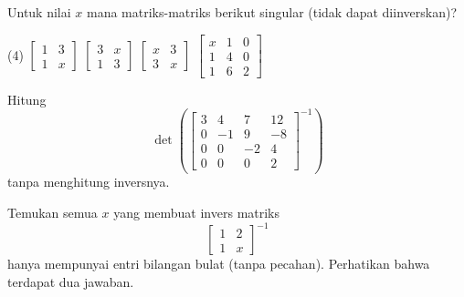\begin{exercise}
Untuk nilai $x$ mana matriks-matriks berikut singular (tidak dapat diinverskan)?
\begin{tasks}(4)
\task
$\begin{bmatrix}
1 & 3 \\
1 & x
\end{bmatrix}$
\task
$\begin{bmatrix}
3 & x \\
1 & 3
\end{bmatrix}$
\task
$\begin{bmatrix}
x & 3 \\
3 & x
\end{bmatrix}$
\task
$\begin{bmatrix}
x & 1 & 0 \\
1 & 4 & 0 \\
1 & 6 & 2
\end{bmatrix}$
\end{tasks}
\end{exercise}

\begin{exercise}
Hitung
\begin{equation*}
\det \left( \begin{bmatrix}
3 & 4 & 7 & 12 \\
0 & -1 & 9 & -8 \\
0 & 0 & -2 & 4 \\
0 & 0 & 0 & 2
\end{bmatrix}^{-1}
\right)
\end{equation*}
tanpa menghitung inversnya.
\end{exercise}

\begin{exercise}[menantang]
Temukan semua $x$ yang membuat invers matriks
\begin{equation*}
\begin{bmatrix}
1 & 2 \\ 1 & x
\end{bmatrix}^{-1}
\end{equation*}
hanya mempunyai entri bilangan bulat (tanpa pecahan).
Perhatikan bahwa terdapat dua jawaban.
\end{exercise}
